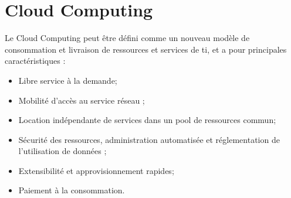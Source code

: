 




\section{Cloud Computing}
Le Cloud Computing peut être défini comme un nouveau modèle de consommation et livraison de ressources et services de \gls{ti}, et a pour principales caractéristiques :
\begin{itemize}
\item Libre service à la demande;
\item Mobilité d'accès au service réseau ;
\item Location indépendante de services dans un pool de ressources commun;
\item Sécurité des ressources, administration automatisée et réglementation de l'utilisation de données ;
\item Extensibilité et approvisionnement rapides;
\item Paiement à la consommation.
\end{itemize}

